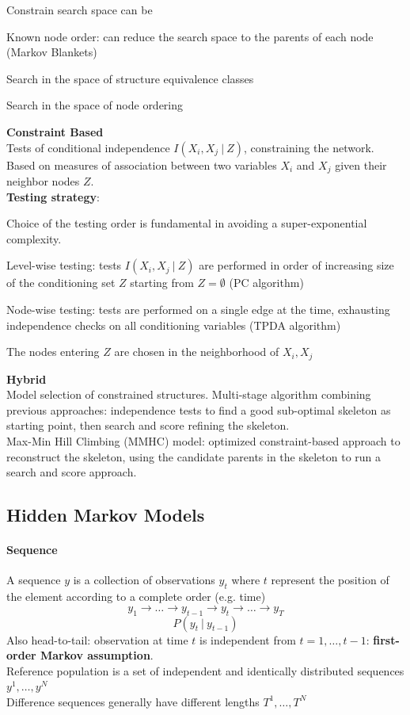 \documentclass[10pt]{report}
\begin{document}
\begin{list}{}{}
	Constrain search space can be\begin{list}{}{}
		\item Known node order: can reduce the search space to the parents of each node (Markov Blankets)
		\item Search in the space of structure equivalence classes
		\item Search in the space of node ordering
	\end{list}
	\item \textbf{Constraint Based}\\
	Tests of conditional independence $I(X_i,X_j\:|\:Z)$, constraining the network. Based on measures of association between two variables $X_i$ and $X_j$ given their neighbor nodes $Z$.\\
	\textbf{Testing strategy}:\begin{list}{}{}
		\item Choice of the testing order is fundamental in avoiding a super-exponential complexity.
		\item Level-wise testing: tests $I(X_i,X_j\:|\:Z)$ are performed in order of increasing size of the conditioning set $Z$ starting from $Z = \emptyset$ (PC algorithm)
		\item Node-wise testing: tests are performed on a single edge at the time, exhausting independence checks on all conditioning variables (TPDA algorithm)
		\item The nodes entering $Z$ are chosen in the neighborhood of $X_i,X_j$
	\end{list}
	\item \textbf{Hybrid}\\
	Model selection of constrained structures. Multi-stage algorithm combining previous approaches: independence tests to find a good sub-optimal skeleton as starting point, then search and score refining the skeleton.\\
	Max-Min Hill Climbing (MMHC) model: optimized constraint-based approach to reconstruct the skeleton, using the candidate parents in the skeleton to run a search and score approach.
\end{list}
\subsection{Hidden Markov Models}
\paragraph{Sequence}A sequence $y$ is a collection of observations $y_t$ where $t$ represent the position of the element according to a complete order (e.g. time)
$$y_1\rightarrow \ldots\rightarrow y_{t-1}\rightarrow y_t\rightarrow\ldots\rightarrow y_T$$
$$P(y_t\:|\:y_{t-1})$$
Also head-to-tail: observation at time $t$ is independent from $t=1,\ldots,t-1$: \textbf{first-order Markov assumption}.\\
Reference population is a set of independent and identically distributed sequences $y^1, \ldots, y^N$\\
Difference sequences generally have different lengths $T^1,\ldots,T^N$
\end{document}
